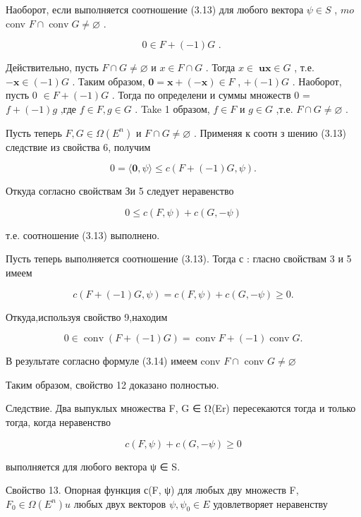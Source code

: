 \documentclass[8pt]{extarticle}
\begin{document}
Наоборот, если выполняется соотношение (3.13) для любого вектора \(\psi  \in  S\) , \({mo}\) conv \(F \cap  \operatorname{conv}G \neq  \varnothing\) .

\[
0 \in  F + \left( {-1}\right) G\text{ . } \tag{3.1}
\]

Действительно, пусть \(F \cap  G \neq  \varnothing\) и \(x \in  F \cap  G\) . Тогда \(x \in \; \mathbf{u}\mathbf{x} \in  G\) , т.е. \(- \mathbf{x} \in  \left( {-1}\right) G\) . Таким образом, \(\mathbf{0} = \mathbf{x} + \left( {-\mathbf{x}}\right)  \in  F\) , \(+ \left( {-1}\right) G\) . Наоборот, пусть 0 \(\in  F + \left( {-1}\right) G\) . Тогда по определени и суммы множеств 0 = \(f + \left( {-1}\right) g\) ,где \(f \in  F,g \in  G\) . Take 1 образом, \(f \in  F\) и \(g \in  G\) ,т.е. \(F \cap  G \neq  \varnothing\) .

Пусть теперь \(F,G \in  \Omega \left( {E}^{n}\right)\) и \(F \cap  G \neq  \varnothing\) . Применяя к соотн з шению (3.13) следствие из свойства 6, получим

\[
0 = \langle \mathbf{0},\psi \rangle  \leq  c\left( {F + \left( {-1}\right) G,\psi }\right) .
\]

Откуда согласно свойствам Зи 5 следует неравенство

\[
0 \leq  c\left( {F,\psi }\right)  + c\left( {G, - \psi }\right)
\]

т.е. соотношение (3.13) выполнено.

Пусть теперь выполняется соотношение (3.13). Тогда с : гласно свойствам 3 и 5 имеем

\[
c\left( {F + \left( {-1}\right) G,\psi }\right)  = c\left( {F,\psi }\right)  + c\left( {G, - \psi }\right)  \geq  0.
\]

Откуда,используя свойство 9,находим

\[
0 \in  \operatorname{conv}\left( {F + \left( {-1}\right) G}\right)  = \operatorname{conv}F + \left( {-1}\right) \operatorname{conv}G.
\]

В результате согласно формуле (3.14) имеем conv \(F \cap\) conv \(G \neq  \varnothing\)

Таким образом, свойство 12 доказано полностью.

Следствие. Два выпуклых множества F, G ∈ Ω(Er) пересекаются тогда и только тогда, когда неравенство

\[
c\left( {F,\psi }\right)  + c\left( {G, - \psi }\right)  \geq  0
\]

выполняется для любого вектора ψ ∈ S.

Свойство 13. Опорная функция с(F, ψ) для любых дву множеств F, \({F}_{0} \in  \Omega \left( {E}^{n}\right) u\) любых двух векторов \(\psi ,{\psi }_{0} \in  E\) удовлетворяет неравенству
\end{document}
